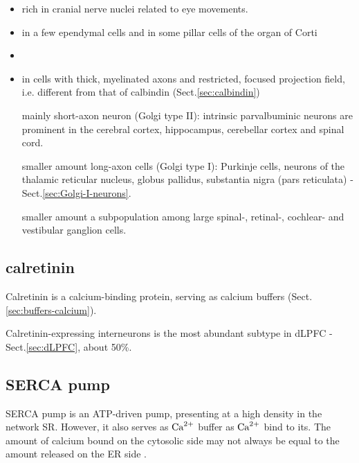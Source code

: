 \begin{itemize}
  \item  rich in cranial nerve nuclei related to eye movements.

  \item in a few ependymal cells and in some pillar cells of the organ of Corti

  \item  
  \item  in cells with thick, myelinated axons and restricted, focused
  projection field, i.e. different from that of calbindin
  (Sect.\ref{sec:calbindin})
  
  \item [mainly] short-axon neuron (Golgi type II): intrinsic parvalbuminic
  neurons are prominent in the cerebral cortex, hippocampus, cerebellar cortex
  and spinal cord.
  
  

  \item [smaller amount] long-axon cells (Golgi type I): Purkinje cells, neurons
  of the thalamic reticular nucleus, globus pallidus, substantia nigra (pars
  reticulata) - Sect.\ref{sec:Golgi-I-neurons}.

  \item [smaller amount] a subpopulation among large spinal-, retinal-,  
  cochlear- and vestibular ganglion cells. 
  
\end{itemize}



\subsection{calretinin}
\label{sec:calretinin}

Calretinin is a calcium-binding protein, serving as calcium buffers
(Sect.\ref{sec:buffers-calcium}).


Calretinin-expressing interneurons is the most abundant subtype in dLPFC -
Sect.\ref{sec:dLPFC}, about 50\%.


\subsection{SERCA pump}
\label{sec:Ca-buffer_SERCA}

SERCA pump is an ATP-driven pump, presenting at a high density in the
network SR. However, it also serves as ${\text{Ca}^{2+}}$ buffer as ${\text{Ca}^{2+}}$ bind to
its.  The amount of calcium bound on the cytosolic side may not always be equal
to the amount released on the ER side \citep{Higgins2006}. 

